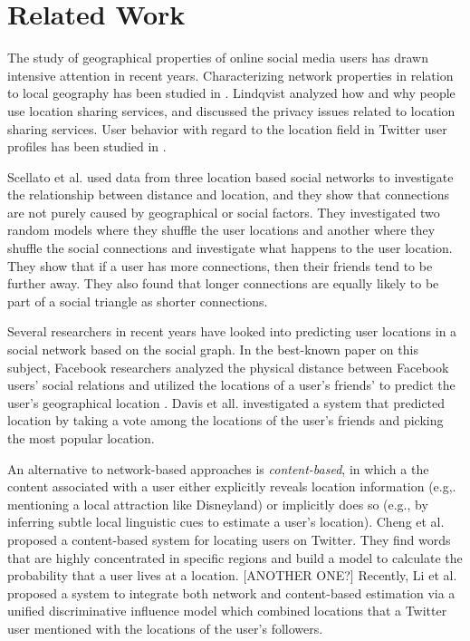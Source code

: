 \documentclass[letterpaper]{article}
\begin{document}
\section{Related Work}
The study of geographical properties of online social media users has drawn intensive attention in recent years. Characterizing network properties in relation to local geography has been studied in \cite{yardi2010tweeting}. Lindqvist \cite{lindqvist2011m} analyzed how and why people use location sharing services, and discussed the privacy issues related to location sharing services.  User behavior with regard to the location field in Twitter user profiles has been studied in \cite{hecht2011tweets}.

Scellato et al. \cite{scellato2011socio} used data from three location based social networks to investigate the relationship between distance and location, and they show that connections are not purely caused by geographical or social factors.  They investigated two random models where they shuffle the user locations and another where they shuffle the social connections and investigate what happens to the user location.  They show that if a user has more connections, then their friends tend to be further away.  They also found that longer connections are equally likely to be part of a social triangle as shorter connections.

Several researchers in recent years have looked into predicting user locations in a social network based on the social graph. In the best-known paper on this subject, Facebook researchers analyzed the physical distance between Facebook users' social relations and utilized the locations of a user's friends' to predict the user's geographical location \cite{backstrom2010find}. Davis et all. \cite{davis2011infer} investigated a system that predicted location by taking a vote among the locations of the user's friends and picking the most popular location.

An alternative to network-based approaches is \textit{content-based}, in which a the content associated with a user either explicitly reveals location information (e.g,. mentioning a local attraction like Disneyland) or implicitly does so (e.g., by inferring subtle local linguistic cues to estimate a user's location). Cheng et al. \cite{cheng2010you} proposed a content-based system for locating users on Twitter. They find words that are highly concentrated in specific regions and build a model to calculate the probability that a user lives at a location. [ANOTHER ONE?] Recently, Li et al. \cite{li2012towards} proposed a system to integrate both network and content-based estimation via a unified discriminative influence model which combined locations that a Twitter user mentioned with the locations of the user's followers.
\end{document}
